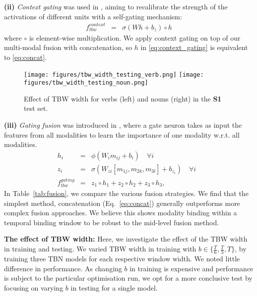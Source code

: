 \documentclass[10pt,twocolumn,letterpaper]{article}
\begin{document}
\noindent \textbf{(ii)} \textit{Context gating} was used in \cite{MiechLS17}, aiming to recalibrate the strength of the activations of different units with a self-gating mechanism:
\begin{eqnarray}\label{eq:context_gating}
f_{tbw}^{context} &= &\sigma(Wh+b_z) \circ h      
\end{eqnarray}
where $\circ$ is element-wise multiplication. We apply
context gating on top of our multi-modal fusion with concatenation, so $h$ in \eqref{eq:context_gating} is equivalent to \eqref{eq:concat}. 

\begin{figure}[t]
\texttt{[image: figures/tbw\_width\_testing\_verb.png]} \texttt{[image: figures/tbw\_width\_testing\_noun.png]}
\caption{Effect of TBW width for verbs (left) and nouns (right) in the \textbf{S1} test set.}
\label{fig:tbw_analysis}
\end{figure}

\noindent \textbf{(iii)} \textit{Gating fusion} was introduced in \cite{gated_multimodal}, where a gate neuron takes as input the features from
all modalities to learn the importance of one modality w.r.t. all modalities. 
\begin{eqnarray}
    h_i&=&\phi(W_im_{ij}+b_i) \quad \forall i \text{     }  \label{eq:h1}\\
    z_i&=&\sigma(W_{zi}[m_{1j},m_{2k},m_{3l}]+b_{z_i}) \quad \forall i \text{       }\\
    f_{tbw}^{gating}&=&z_1\circ h_1 + z_2\circ h_2 + z_3\circ h_3\label{eq:unconstrained}\text{,}
\end{eqnarray}
\noindent In Table~\ref{tab:fusion}, we compare the various fusion strategies. We find that the simplest method, concatenation (Eq.~\ref{eq:concat}) generally outperforms 
more complex fusion approaches. 
We believe this shows modality binding within a temporal binding window to be robust to the mid-level fusion method.



\noindent\textbf{The effect of TBW width:}
Here, we investigate the effect of the TBW width in training and testing.
We varied TBW width in training with $b \in \{\frac{T}{6}, \frac{T}{3}, T\}$, by training three TBN models for each respective window width. We noted little difference in performance. As changing $b$ in training is expensive and performance is subject to the particular optimisation run, we opt for a more conclusive test by focusing on varying $b$ in testing for a single model.
\end{document}
